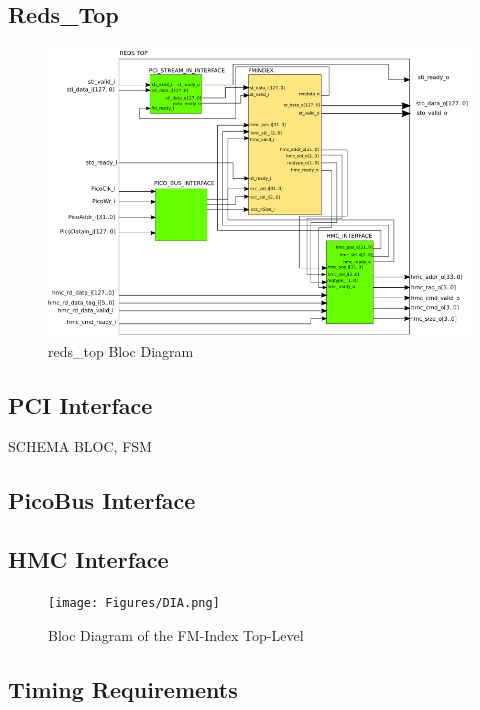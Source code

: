 \subsection{Reds\_Top}
\begin{figure}[H]
    \centering
    \includegraphics[scale = 0.55]{Figures/REDS_TOP_DIAG.png}
    \caption{reds\_top Bloc Diagram}
    \label{fig:reds_top_diag}
\end{figure}

\subsection{PCI Interface}

SCHEMA BLOC, FSM

\subsection{PicoBus Interface}

\subsection{HMC Interface}

\begin{figure}[H]
    \centering
    \hspace*{-20mm}\texttt{[image: Figures/DIA.png]}
    \caption{Bloc Diagram of the FM-Index Top-Level}
    \label{fig:seqschema}
\end{figure}

\subsection{Timing Requirements}

